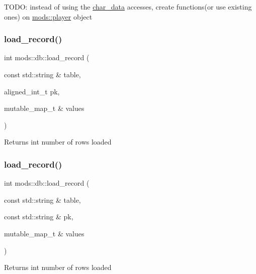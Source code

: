 T\+O\+DO\+: instead of using the \hyperlink{structchar__data}{char\+\_\+data} accesses, create functions(or use existing ones) on \hyperlink{classmods_1_1player}{mods\+::player} object \mbox{\label{namespacemods_1_1db_acf6aefd449f5fcb8d9987a37cc1d7ba8}} 
\subsubsection{\texorpdfstring{load\+\_\+record()}{load\_record()}\hspace{0.1cm}{\footnotesize\ttfamily [1/2]}}
{\footnotesize\ttfamily int mods\+::db\+::load\+\_\+record (\begin{DoxyParamCaption}\item[{const std\+::string \&}]{table,  }\item[{aligned\+\_\+int\+\_\+t}]{pk,  }\item[{mutable\+\_\+map\+\_\+t \&}]{values }\end{DoxyParamCaption})}

\begin{DoxyReturn}{Returns}
int number of rows loaded 
\end{DoxyReturn}
\mbox{\label{namespacemods_1_1db_a0e743f7d6ff025f86a1bdbcc9b726e8c}} 
\subsubsection{\texorpdfstring{load\+\_\+record()}{load\_record()}\hspace{0.1cm}{\footnotesize\ttfamily [2/2]}}
{\footnotesize\ttfamily int mods\+::db\+::load\+\_\+record (\begin{DoxyParamCaption}\item[{const std\+::string \&}]{table,  }\item[{const std\+::string \&}]{pk,  }\item[{mutable\+\_\+map\+\_\+t \&}]{values }\end{DoxyParamCaption})}

\begin{DoxyReturn}{Returns}
int number of rows loaded 
\end{DoxyReturn}
\mbox{\label{namespacemods_1_1db_a2ec81c8ca3ce3f3a4b27b68645bf4e1d}} 
